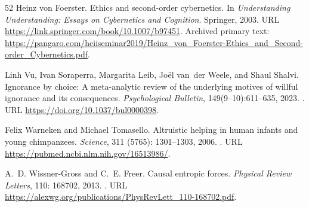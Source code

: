 \documentclass[11pt,a4paper]{article}
\theoremstyle{remark}
\begin{document}
\begin{thebibliography}{52}
Heinz von Foerster.
\newblock Ethics and second-order cybernetics.
\newblock In \emph{Understanding Understanding: Essays on Cybernetics and
  Cognition}. Springer, 2003.
\newblock URL \url{https://link.springer.com/book/10.1007/b97451}.
\newblock Archived primary text:
  \url{https://pangaro.com/hciiseminar2019/Heinz_von_Foerster-Ethics_and_Second-order_Cybernetics.pdf}.

Linh Vu, Ivan Soraperra, Margarita Leib, Jo{\"e}l van~der Weele, and Shaul Shalvi.
\newblock Ignorance by choice: A meta-analytic review of the underlying motives
of willful ignorance and its consequences.
\newblock \emph{Psychological Bulletin}, 149(9--10):611--635, 2023.
\newblock {}.
\newblock URL \url{https://doi.org/10.1037/bul0000398}.

Felix Warneken and Michael Tomasello.
\newblock Altruistic helping in human infants and young chimpanzees.
\newblock \emph{Science}, 311 (5765): 1301--1303, 2006.
\newblock {}.
\newblock URL \url{https://pubmed.ncbi.nlm.nih.gov/16513986/}.

A.~D. Wissner-Gross and C.~E. Freer.
\newblock Causal entropic forces.
\newblock \emph{Physical Review Letters}, 110: 168702, 2013.
\newblock {}.
\newblock URL \url{https://alexwg.org/publications/PhysRevLett_110-168702.pdf}.

\end{thebibliography}
\end{document}
